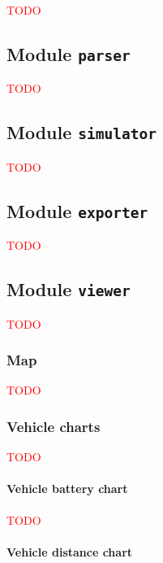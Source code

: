 \documentclass[10pt,twocolumn]{article}
\begin{document}
\textcolor{red}{TODO}

\subsection{Module \texttt{parser}}

\textcolor{red}{TODO}

\subsection{Module \texttt{simulator}}

\textcolor{red}{TODO}

\subsection{Module \texttt{exporter}}

\textcolor{red}{TODO}

\subsection{Module \texttt{viewer}}
\label{sec:gui}

\textcolor{red}{TODO}


\subsubsection{Map}

\textcolor{red}{TODO}

\subsubsection{Vehicle charts}

\textcolor{red}{TODO}

\paragraph{Vehicle battery chart}

\textcolor{red}{TODO}

\paragraph{Vehicle distance chart}
\end{document}

